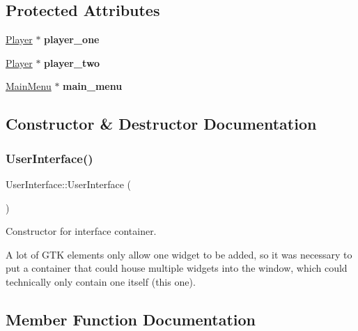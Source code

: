 \subsection*{Protected Attributes}
\begin{DoxyCompactItemize}
\item 
\mbox{\label{classUserInterface_a547735da5069693e1a0065b548061eb7}} 
\mbox{\hyperlink{classPlayer}{Player}} $\ast$ {\bfseries player\+\_\+one}
\item 
\mbox{\label{classUserInterface_a819dd9b74c751af9cc3b904ea33001cd}} 
\mbox{\hyperlink{classPlayer}{Player}} $\ast$ {\bfseries player\+\_\+two}
\item 
\mbox{\label{classUserInterface_a6203a657f8befd5a726cdd0fb4c465c2}} 
\mbox{\hyperlink{classMainMenu}{Main\+Menu}} $\ast$ {\bfseries main\+\_\+menu}
\end{DoxyCompactItemize}


\subsection{Constructor \& Destructor Documentation}
\mbox{\label{classUserInterface_ae6fb70370701b3bd6120e923df9705b0}} 
\subsubsection{\texorpdfstring{UserInterface()}{UserInterface()}}
{\footnotesize\ttfamily User\+Interface\+::\+User\+Interface (\begin{DoxyParamCaption}{ }\end{DoxyParamCaption})}



Constructor for interface container. 

A lot of G\+TK elements only allow one widget to be added, so it was necessary to put a container that could house multiple widgets into the window, which could technically only contain one itself (this one). 

\subsection{Member Function Documentation}
\mbox{\label{classUserInterface_a3d06cc28243bc3807a2a713de016d657}} 
